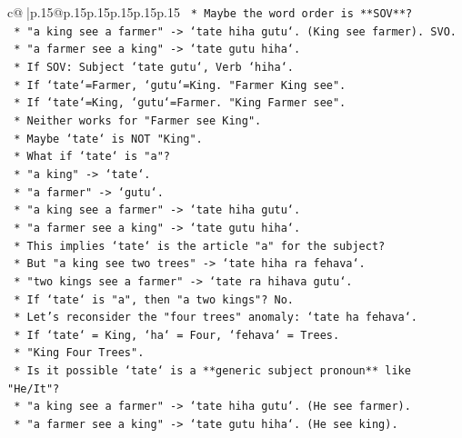 \documentclass{article}
\begin{document}
{\begin{supertabular}{c@{$\;$}|p{.15\linewidth}@{}p{.15\linewidth}p{.15\linewidth}p{.15\linewidth}p{.15\linewidth}p{.15\linewidth}}
{{{\texttt{            *   Maybe the word order is **SOV**?} \\
\texttt{                *   "a king see a farmer" {-}> `tate hiha gutu`. (King see farmer). SVO.} \\
\texttt{                *   "a farmer see a king" {-}> `tate gutu hiha`.} \\
\texttt{                *   If SOV: Subject `tate gutu`, Verb `hiha`.} \\
\texttt{                *   If `tate`=Farmer, `gutu`=King. "Farmer King see".} \\
\texttt{                *   If `tate`=King, `gutu`=Farmer. "King Farmer see".} \\
\texttt{                *   Neither works for "Farmer see King".} \\
\texttt{            *   Maybe `tate` is NOT "King".} \\
\texttt{            *   What if `tate` is "a"?} \\
\texttt{                *   "a king" {-}> `tate`.} \\
\texttt{                *   "a farmer" {-}> `gutu`.} \\
\texttt{                *   "a king see a farmer" {-}> `tate hiha gutu`.} \\
\texttt{                *   "a farmer see a king" {-}> `tate gutu hiha`.} \\
\texttt{                *   This implies `tate` is the article "a" for the subject?} \\
\texttt{                *   But "a king see two trees" {-}> `tate hiha ra fehava`.} \\
\texttt{                *   "two kings see a farmer" {-}> `tate ra hihava gutu`.} \\
\texttt{                *   If `tate` is "a", then "a two kings"? No.} \\
\texttt{        *   Let's reconsider the "four trees" anomaly: `tate ha fehava`.} \\
\texttt{        *   If `tate` = King, `ha` = Four, `fehava` = Trees.} \\
\texttt{        *   "King Four Trees".} \\
\texttt{        *   Is it possible `tate` is a **generic subject pronoun** like "He/It"?} \\
\texttt{            *   "a king see a farmer" {-}> `tate hiha gutu`. (He see farmer).} \\
\texttt{            *   "a farmer see a king" {-}> `tate gutu hiha`. (He see king).} \\
}}}
\end{supertabular}}
\end{document}
